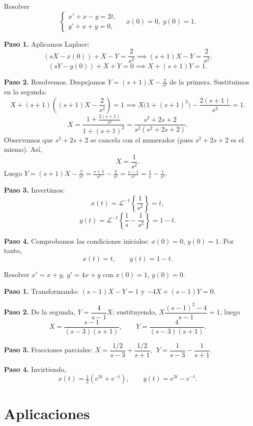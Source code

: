 \begin{example}
Resolver
\[
\begin{cases}
x' + x - y = 2t,\\
y' + x + y = 0,
\end{cases}
\quad
x(0)=0,\ y(0)=1.
\]
\begin{myproof}
\textbf{Paso 1.} Aplicamos Laplace:
\[
(sX - x(0)) + X - Y = \frac{2}{s^2} \implies (s+1)X - Y = \frac{2}{s^2}.
\]
\[
(sY - y(0)) + X + Y = 0 \implies X + (s+1)Y = 1.
\]

\textbf{Paso 2.} Resolvemos. Despejamos $Y = (s+1)X - \frac{2}{s^2}$ de la primera. Sustituimos en la segunda:
\[
X + (s+1)\left((s+1)X - \frac{2}{s^2}\right) = 1 \implies X\big(1+(s+1)^2\big) - \frac{2(s+1)}{s^2} = 1.
\]
\[
X = \frac{1 + \frac{2(s+1)}{s^2}}{1+(s+1)^2} = \frac{s^2 + 2s + 2}{s^2(s^2+2s+2)}.
\]
Observamos que $s^2+2s+2$ se cancela con el numerador (pues $s^2+2s+2$ es el mismo). Así,
\[
X = \frac{1}{s^2}.
\]
Luego $Y = (s+1)X - \frac{2}{s^2} = \frac{s+1}{s^2} - \frac{2}{s^2} = \frac{s-1}{s^2} = \frac{1}{s} - \frac{1}{s^2}$.

\textbf{Paso 3.} Invertimos:
\[
x(t) = \mathcal{L}^{-1}\left\{\frac{1}{s^2}\right\} = t,
\]
\[
y(t) = \mathcal{L}^{-1}\left\{\frac{1}{s} - \frac{1}{s^2}\right\} = 1 - t.
\]

\textbf{Paso 4.} Comprobamos las condiciones iniciales: $x(0)=0$, $y(0)=1$. Por tanto,
\[
\boxed{x(t)=t,\qquad y(t)=1-t.}
\]
\end{myproof}
\end{example}

\begin{example}
Resolver $x'=x+y$, $y'=4x+y$ con $x(0)=1$, $y(0)=0$.
\begin{myproof}
\textbf{Paso 1.} Transformando: $(s-1)X-Y=1$ y $-4X+(s-1)Y=0$.

\textbf{Paso 2.} De la segunda, $Y=\dfrac{4}{s-1}X$; sustituyendo, $X\dfrac{(s-1)^2-4}{s-1}=1$, luego
\[
X=\frac{s-1}{(s-3)(s+1)},\qquad Y=\frac{4}{(s-3)(s+1)}.
\]

\textbf{Paso 3.} Fracciones parciales: $X=\dfrac{1/2}{s-3}+\dfrac{1/2}{s+1}$, $\;Y=\dfrac{1}{s-3}-\dfrac{1}{s+1}$.

\textbf{Paso 4.} Invirtiendo,
\[
\boxed{x(t)=\tfrac12(e^{3t}+e^{-t}),\qquad y(t)=e^{3t}-e^{-t}.}
\]
\end{myproof}
\end{example}

\section{Aplicaciones}

